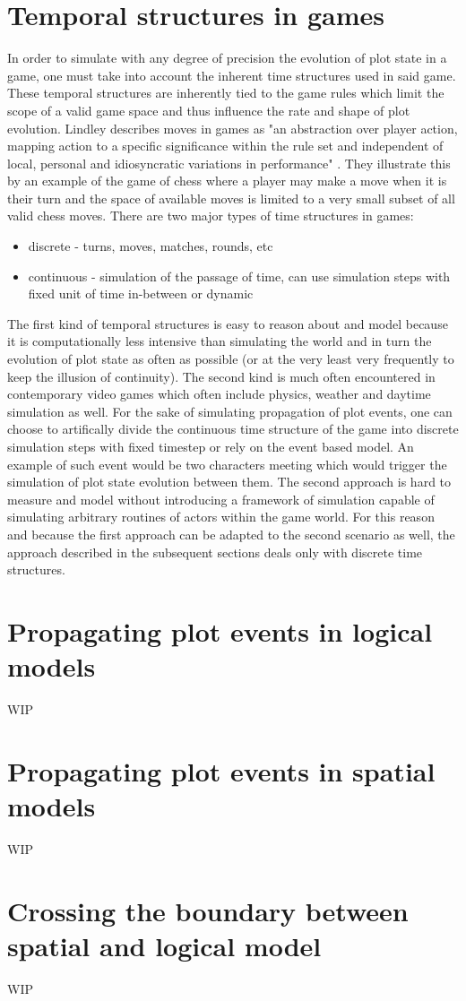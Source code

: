 
\section{Temporal structures in games}

In order to simulate with any degree of precision the evolution of plot state in a game, one must take into account the inherent time structures used in said game.
These temporal structures are inherently tied to the game rules which limit the scope of a valid game space and thus influence the rate and shape of plot evolution.
Lindley describes moves in games as "an abstraction over player action, mapping action to a specific significance within the rule set and independent of local, personal and idiosyncratic variations in performance" \cite{lindley2005story}.
They illustrate this by an example of the game of chess where a player may make a move when it is their turn and the space of available moves is limited to a very small subset of all valid chess moves.
There are two major types of time structures in games:

\begin{itemize}
    \item discrete - turns, moves, matches, rounds, etc
    \item continuous - simulation of the passage of time, can use simulation steps with fixed unit of time in-between or dynamic
\end{itemize}

The first kind of temporal structures is easy to reason about and model because it is computationally less intensive than simulating the world and in turn the evolution of plot state as often as possible (or at the very least very frequently to keep the illusion of continuity).
The second kind is much often encountered in contemporary video games which often include physics, weather and daytime simulation as well.
For the sake of simulating propagation of plot events, one can choose to artifically divide the continuous time structure of the game into discrete simulation steps with fixed timestep or rely on the event based model.
An example of such event would be two characters meeting which would trigger the simulation of plot state evolution between them.
The second approach is hard to measure and model without introducing a framework of simulation capable of simulating arbitrary routines of actors within the game world.
For this reason and because the first approach can be adapted to the second scenario as well, the approach described in the subsequent sections deals only with discrete time structures.

\section{Propagating plot events in logical models}

WIP

\section{Propagating plot events in spatial models}

WIP

\section{Crossing the boundary between spatial and logical model}

WIP